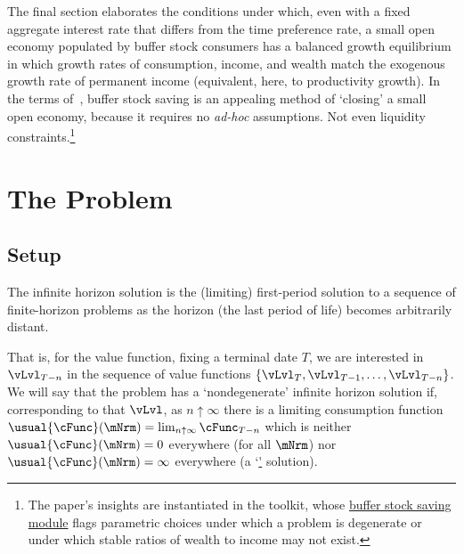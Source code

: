 \documentclass[BufferStockTheory]{subfiles}
\begin{document}
The final section elaborates the conditions under which, even with a fixed aggregate interest rate that differs from the time preference rate, a small open economy populated by buffer stock consumers has a balanced growth equilibrium in which growth rates of consumption, income, and wealth match the exogenous growth rate of permanent income (equivalent, here, to productivity growth). In the terms of~\cite{schmitt2003closing}, buffer stock saving is an appealing method of `closing' a small open economy, because it requires no \textit{ad-hoc} assumptions.  Not even liquidity constraints.\footnote{The paper's insights are instantiated in the {\ARKurl} toolkit, whose \href{https://hark.readthedocs.io/en/stable/reference/ConsumptionSaving/ConsIndShockModel.html}{buffer stock saving module} flags parametric choices under which a problem is degenerate or under which stable ratios of wealth to income may not exist.}


\hypertarget{The-Problem}{}
\section{The Problem}
\subsection{Setup}\label{subsec:Setup}

The infinite horizon solution is the (limiting) first-period solution to a sequence of finite-horizon problems as the horizon (the last period of life) becomes arbitrarily distant.

\hypertarget{sensible}{}\hypertarget{useful}{}
That is, for the value function, fixing a terminal date $T$,  we are interested in $\vLvl_{T-n}$ in the sequence of value functions $\{\vLvl_{T},\vLvl_{T-1},\ldots,\vLvl_{T-n}\}$.  We will say that the problem has a `nondegenerate' infinite horizon solution if, corresponding to that $\vLvl$, as $n \uparrow \infty$ there is a limiting consumption function $\usual{\cFunc}(\mNrm) = \lim_{n \uparrow \infty} \cFunc_{T-n}$ which is neither $\usual{\cFunc}(\mNrm)=0$ everywhere (for all $\mNrm$) nor $\usual{\cFunc}(\mNrm)=\infty$ everywhere (a `\hyperlink{sensible}' solution).
\end{document}

